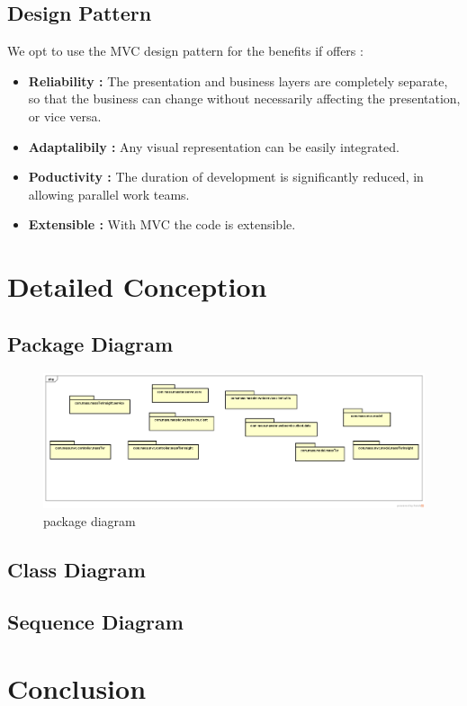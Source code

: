 \documentclass[12pt]{article}
\begin{document}
    \clearpage
	\newpage
	\subsection{Design Pattern}
		We opt to use the MVC design pattern for the benefits if offers :
	\begin{itemize}
		\item \textbf{Reliability : }The presentation and business layers are completely separate, so that the business can change without necessarily affecting the presentation, or vice versa.
		\item \textbf{Adaptalibily : }Any visual representation can be easily integrated.
		\item \textbf{Poductivity : }The duration of development is significantly reduced, in allowing parallel work teams.
		\item \textbf{Extensible : } With MVC the code is extensible.
	\end{itemize}

	\clearpage
    \newpage

	\section{Detailed Conception}
    \clearpage
	\newpage
	\subsection{Package Diagram}
		\begin{figure}[h]
		\centering
		\includegraphics[width=1\textwidth]{packageDiagram.png}
		\caption{package diagram}
	\end{figure}  
	
	\clearpage
	\newpage
	\subsection{Class Diagram}
	\clearpage
	\newpage
	\subsection{Sequence Diagram}
	\clearpage
	\newpage
	\section{Conclusion}
	
\end{document}
